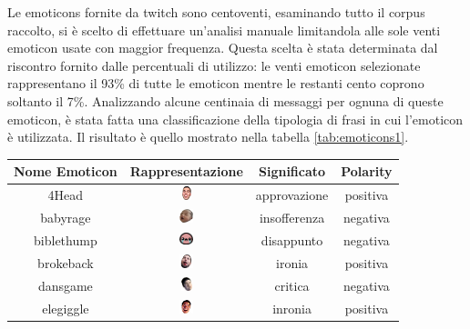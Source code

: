 \documentclass[a4paper,12pt,openright,twoside]{report}
\theoremstyle{definition}
\begin{document}
Le emoticons fornite da twitch sono centoventi, esaminando tutto il corpus raccolto, si è scelto 
di effettuare un'analisi
manuale limitandola alle sole venti emoticon usate con maggior frequenza. 
Questa scelta è stata determinata 
dal riscontro fornito dalle percentuali di utilizzo: le venti emoticon selezionate rappresentano 
il 93\% di tutte le emoticon mentre le restanti cento coprono soltanto il 7\%. 
Analizzando alcune centinaia di messaggi 
per ognuna di queste emoticon,
è stata fatta una classificazione della tipologia di frasi in cui l'emoticon è utilizzata. Il risultato è
quello mostrato nella tabella \ref{tab:emoticons1}.

\begin{table}[H]
\begin{center}
\begin{tabular}{|c|c|c|c|}
\hline
Nome Emoticon & Rappresentazione & Significato & Polarity \\
\hline
\hline
4Head & \includegraphics[height=0.4cm, width=0.4cm]{Immagini/Emoticons/4head.png} & approvazione & positiva \\
\hline
babyrage & \includegraphics[height=0.4cm, width=0.4cm]{Immagini/Emoticons/babyrage.png} & insofferenza & negativa \\
\hline
biblethump & \includegraphics[height=0.4cm, width=0.4cm]{Immagini/Emoticons/biblethump.png} & disappunto & negativa \\
\hline
brokeback & \includegraphics[height=0.4cm, width=0.4cm]{Immagini/Emoticons/brokeback.png} & ironia & positiva \\
\hline
dansgame &  \includegraphics[height=0.4cm, width=0.4cm]{Immagini/Emoticons/dansgame.png} & critica & negativa \\
\hline
elegiggle & \includegraphics[height=0.4cm, width=0.4cm]{Immagini/Emoticons/elegiggle.png} & inronia & positiva \\

\end{tabular}
\end{center}
\end{table}
\end{document}
